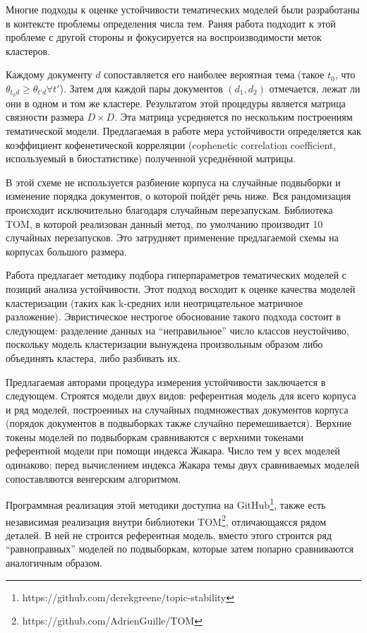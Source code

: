 Многие подходы к оценке устойчивости тематических моделей были разработаны в контексте проблемы определения числа тем. Раняя работа \cite{Brunet4164} подходит к этой проблеме с другой стороны и фокусируется на воспроизводимости меток кластеров.

Каждому документу $d$ сопоставляется его наиболее вероятная тема (такое $t_0$, что $\theta_{t_0 d} \geq \theta_{t' d} \forall t'$). Затем для каждой пары документов $(d_1, d_2)$ отмечается, лежат ли они в одном и том же кластере. Результатом этой процедуры является матрица связности размера $D \times D$. Эта матрица усредняется по нескольким построениям тематической модели. Предлагаемая в работе мера устойчивости определяется как коэффициент кофенетической корреляции (cophenetic correlation coefficient, используемый в биостатистике) полученной усреднённой матрицы.

В этой схеме не используется разбиение корпуса на случайные подвыборки и изменение порядка документов, о которой пойдёт речь ниже. Вся рандомизация происходит исключительно благодаря случайным перезапускам. Библиотека TOM, в которой реализован данный метод, по умолчанию производит 10 случайных перезапусков. Это затрудняет применение предлагаемой схемы на корпусах большого размера.

Работа \cite{greene14howmany} предлагает методику подбора гиперпараметров тематических моделей с позиций анализа устойчивости. Этот подход восходит к оценке качества моделей кластеризации (таких как k-средних или неотрицательное матричное разложение). Эвристическое нестрогое обоснование такого подхода состоит в следующем: разделение данных на ``неправильное'' число классов неустойчиво, поскольку модель кластеризации вынуждена произвольным образом либо объединять кластера, либо разбивать их.

Предлагаемая авторами процедура измерения устойчивости заключается в следующем. Строятся модели двух видов: референтная модель для всего корпуса и ряд моделей, построенных на случайных подмножествах документов корпуса (порядок документов в подвыборках также случайно перемешивается). Верхние токены моделей по подвыборкам сравниваются с верхними токенами референтной модели при помощи индекса Жакара. Число тем у всех моделей одинаково; перед вычислением индекса Жакара темы двух сравниваемых моделей сопоставляются венгерским алгоритмом.

Программная реализация этой методики доступна на GitHub\footnote{https://github.com/derekgreene/topic-stability}, также есть независимая реализация внутри библиотеки TOM\footnote{https://github.com/AdrienGuille/TOM}, отличающаясся рядом деталей. В ней не строится референтная модель, вместо этого строится ряд ``равноправных'' моделей по подвыборкам, которые затем попарно сравниваются аналогичным образом.

